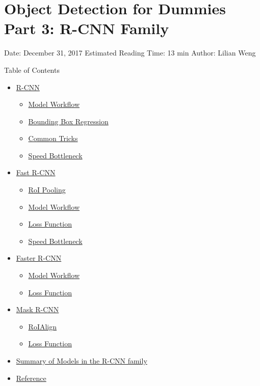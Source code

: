 \section{Object Detection for Dummies Part 3: R-CNN Family}\label{object-detection-for-dummies-part-3-r-cnn-family}

Date: December 31, 2017 \textbar{} Estimated Reading Time: 13 min \textbar{} Author: Lilian Weng

{Table of Contents}

\begin{itemize}
\tightlist
\item
  \hyperref[r-cnn]{R-CNN}

  \begin{itemize}
  \tightlist
  \item
    \hyperref[model-workflow]{Model Workflow}
  \item
    \hyperref[bounding-box-regression]{Bounding Box Regression}
  \item
    \hyperref[common-tricks]{Common Tricks}
  \item
    \hyperref[speed-bottleneck]{Speed Bottleneck}
  \end{itemize}
\item
  \hyperref[fast-r-cnn]{Fast R-CNN}

  \begin{itemize}
  \tightlist
  \item
    \hyperref[roi-pooling]{RoI Pooling}
  \item
    \hyperref[model-workflow-1]{Model Workflow}
  \item
    \hyperref[loss-function]{Loss Function}
  \item
    \hyperref[speed-bottleneck-1]{Speed Bottleneck}
  \end{itemize}
\item
  \hyperref[faster-r-cnn]{Faster R-CNN}

  \begin{itemize}
  \tightlist
  \item
    \hyperref[model-workflow-2]{Model Workflow}
  \item
    \hyperref[loss-function-1]{Loss Function}
  \end{itemize}
\item
  \hyperref[mask-r-cnn]{Mask R-CNN}

  \begin{itemize}
  \tightlist
  \item
    \hyperref[roialign]{RoIAlign}
  \item
    \hyperref[loss-function-2]{Loss Function}
  \end{itemize}
\item
  \hyperref[summary-of-models-in-the-r-cnn-family]{Summary of Models in the R-CNN family}
\item
  \hyperref[reference]{Reference}
\end{itemize}

